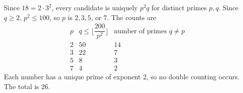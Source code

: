 Since $18=2\cdot3^2$, every candidate is uniquely $p^2q$ for distinct primes $p,q$. Since $q\ge2$, $p^2\le100$, so $p$ is $2,3,5$, or $7$. The counts are
\[
\begin{array}{c|c|c}
p&q\le\lfloor\dfrac{200}{p^2}\rfloor&\text{number of primes }q\ne p\\\hline
2&50&14\\3&22&7\\5&8&3\\7&4&2
\end{array}
\]
Each number has a unique prime of exponent $2$, so no double counting occurs. The total is $\boxed{26}$.
